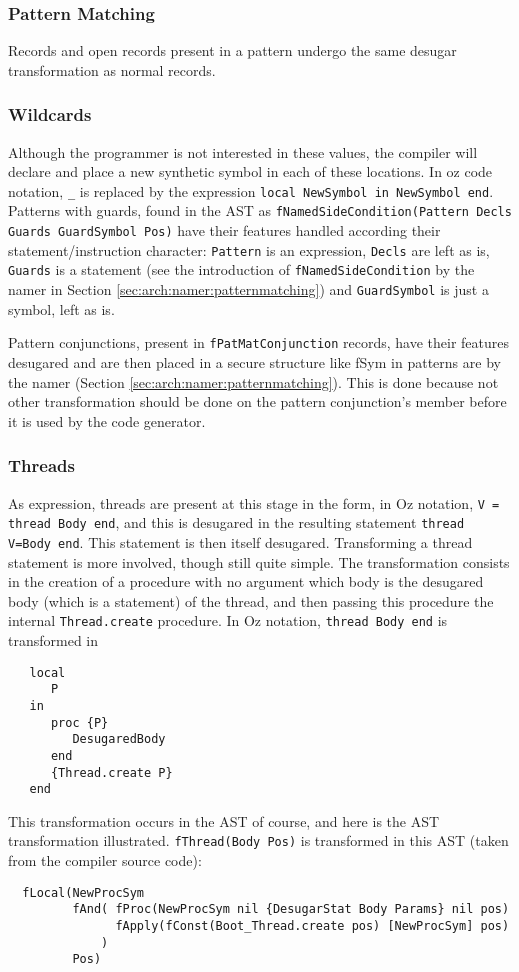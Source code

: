 \documentclass[a4paper]{memoir}
\begin{document}
\subsubsection{Pattern Matching}
Records and open records present in a pattern undergo the same desugar
transformation as normal records.
\subsubsection{Wildcards}
Although the programmer is not interested in these values, the compiler will declare and place a new synthetic symbol in each of these locations. In oz code notation, \lstinline!_! is replaced by the expression \lstinline!local NewSymbol in NewSymbol end!.
Patterns with guards, found in the AST as \lstinline!fNamedSideCondition(Pattern Decls Guards GuardSymbol Pos)! 
have their features handled according their statement/instruction character:
\lstinline!Pattern! is an expression, \lstinline!Decls! are left as is,
\lstinline!Guards! is a statement (see the introduction
of \lstinline!fNamedSideCondition! by the namer in Section
\ref{sec:arch:namer:patternmatching}) and \lstinline!GuardSymbol! is just a
symbol, left as is.

Pattern conjunctions, present in \lstinline!fPatMatConjunction! records, have
their features desugared and are then placed in a secure structure like fSym in
patterns are by the namer (Section \ref{sec:arch:namer:patternmatching}).
This is done because not other transformation should be done on the pattern
conjunction's member before it is used by the code generator.


\subsubsection{Threads}
As expression, threads are present at this stage in the form, in Oz notation, \lstinline!V = thread Body end!, and this is desugared in the resulting statement \lstinline!thread V=Body end!. This statement is then itself desugared.
Transforming a thread statement is more involved, though still quite simple. The transformation consists in the creation of a procedure with no argument which body is the desugared body (which is a statement) of the thread, and then passing this procedure the internal \lstinline!Thread.create! procedure.
In Oz notation, \lstinline!thread Body end! is transformed in 
\begin{lstlisting}
   local 
      P 
   in 
      proc {P} 
         DesugaredBody 
      end 
      {Thread.create P}
   end
\end{lstlisting}
This transformation occurs in the AST of course, and here is the AST transformation illustrated. \lstinline!fThread(Body Pos)! is transformed in this AST (taken from the compiler source code):
\begin{lstlisting}
  fLocal(NewProcSym 
         fAnd( fProc(NewProcSym nil {DesugarStat Body Params} nil pos) 
               fApply(fConst(Boot_Thread.create pos) [NewProcSym] pos)
             ) 
         Pos)
\end{lstlisting}
\end{document}
